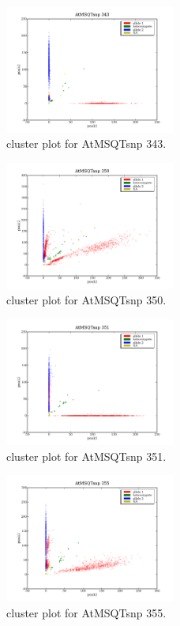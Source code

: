 \begin{figure}[H]
\includegraphics[width=0.5\textwidth]{figures/cluster_plot_AtMSQTsnp_343.png}
\caption{cluster plot for AtMSQTsnp 343.} \label{flAtMSQTsnp343}
\end{figure}
\begin{figure}[H]
\includegraphics[width=0.5\textwidth]{figures/cluster_plot_AtMSQTsnp_350.png}
\caption{cluster plot for AtMSQTsnp 350.} \label{flAtMSQTsnp350}
\end{figure}
\begin{figure}[H]
\includegraphics[width=0.5\textwidth]{figures/cluster_plot_AtMSQTsnp_351.png}
\caption{cluster plot for AtMSQTsnp 351.} \label{flAtMSQTsnp351}
\end{figure}
\begin{figure}[H]
\includegraphics[width=0.5\textwidth]{figures/cluster_plot_AtMSQTsnp_355.png}
\caption{cluster plot for AtMSQTsnp 355.} \label{flAtMSQTsnp355}
\end{figure}
